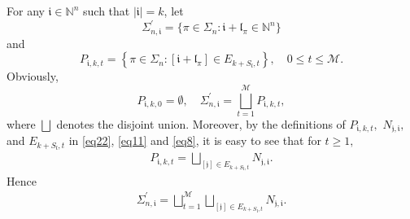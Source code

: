 \documentclass[11pt]{article}
\theoremstyle{plain}
\theoremstyle{definition}
\begin{document}
For any $\mathfrak{i} \in \mathbb{N}^n$
  such that $|\mathfrak{i}|= k$, let
 \begin{equation}\label{eq2233}\Sigma_{n,\mathfrak{i}}^{\prime}=\{\pi\in\Sigma_{n}: \mathfrak{i}+\mathfrak{l}_\pi \in \mathbb{N}^n\}\end{equation}
and \begin{equation}\label{eq22}
		P_{\mathfrak{i},k,t  }=\left \{ \pi\in\Sigma_{n}:[\mathfrak{i}+\mathfrak{l}_\pi]\in E_{k+S_{\mathfrak{l}},t } \right \}, \quad 0 \leq t \leq \mathscr{M}.
	\end{equation}
Obviously, 
$$ P_{\mathfrak{i},k,0 }=\emptyset, \quad \Sigma_{n,\mathfrak{i}}^{\prime}= \mathop{\bigsqcup}_{t=1}^{\mathscr{M}}P_{\mathfrak{i},k,t},$$
where $\bigsqcup$ denotes the disjoint union.
Moreover, by the definitions of $P_{\mathfrak{i},k,t  },$ $N_{\mathfrak{j}, \mathfrak{i}  },$ and $E_{k+S_{\mathfrak{l}},t }$  in \eqref{eq22}, \eqref{eq11} and \eqref{eq8}, it is easy to see that for $t\geq 1,$
\begin{eqnarray}\label{eq3.1}
P_{\mathfrak{i},k,t  }= \bigsqcup\limits_{[\mathfrak{j}]\in E_{k+S_{\mathfrak{l}},t}} N_{\mathfrak{j},\mathfrak{i}}.
\end{eqnarray}
Hence 
\begin{eqnarray}\label{eq3.1111}
\Sigma_{n,\mathfrak{i}}^{\prime} = \mathop{\bigsqcup}_{t=1}^{\mathscr{M}}\bigsqcup\limits_{[\mathfrak{j}] \in E_{k+S_{\mathfrak{l}},t}} N_{\mathfrak{j},\mathfrak{i}}.
\end{eqnarray}
\end{document}
